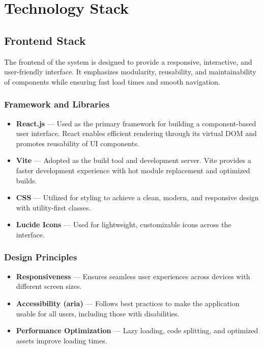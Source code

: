 \chapter{Technology Stack}
\section{Frontend Stack}

The frontend of the system is designed to provide a responsive, interactive, and user-friendly interface. It emphasizes modularity, reusability, and maintainability of components while ensuring fast load times and smooth navigation.

\subsection{Framework and Libraries}
\begin{itemize}
    \item \textbf{React.js} --- Used as the primary framework for building a component-based user interface. React enables efficient rendering through its virtual DOM and promotes reusability of UI components.
    \item \textbf{Vite} --- Adopted as the build tool and development server. Vite provides a faster development experience with hot module replacement and optimized builds.
    \item \textbf{CSS} --- Utilized for styling to achieve a clean, modern, and responsive design with utility-first classes.
    \item \textbf{Lucide Icons} --- Used for lightweight, customizable icons across the interface.
\end{itemize}

\subsection{Design Principles}
\begin{itemize}
    \item \textbf{Responsiveness} --- Ensures seamless user experiences across devices with different screen sizes.
    \item \textbf{Accessibility (aria)} --- Follows best practices to make the application usable for all users, including those with disabilities.
    \item \textbf{Performance Optimization} --- Lazy loading, code splitting, and optimized assets improve loading times.
\end{itemize}


